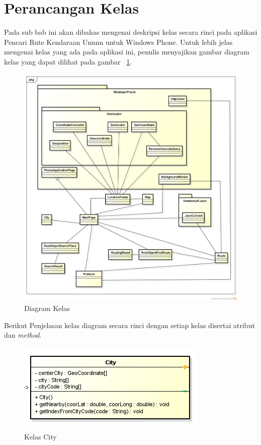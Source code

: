 \newpage

\section{Perancangan Kelas}
\label{lab:Perancangan Kelas}
\hspace{0.5cm} Pada sub bab ini akan dibahas mengenai deskripsi kelas secara rinci pada aplikasi Pencari Rute Kendaraan Umum untuk Windows Phone. Untuk lebih jelas mengenai kelas yang ada pada aplikasi ini, penulis menyajikan gambar diagram kelas yang dapat dilihat pada  gambar ~\ref{fig:kelas}. 

\begin{figure}[h!]
	\centering
		\includegraphics[scale=0.3]{Gambar/useCase_dan_Class/class4kosong}
	\caption{Diagram Kelas}
	\label{fig:kelas}
\end{figure}

Berikut Penjelasan kelas diagram secara rinci dengan setiap kelas disertai atribut dan \textit{method}.

\begin{figure}[h!]
	\centering
		\includegraphics[scale=0.6]{Gambar/useCase_dan_Class/perClass/city}
	\caption{Kelas City}
	\label{fig:kelasCity}
\end{figure}

